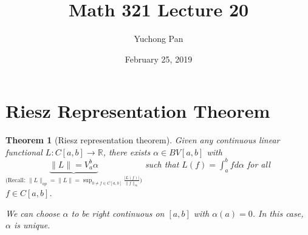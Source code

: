 \documentclass[letterpaper, reqno,11pt]{article}
\newcommand{\RR}{\mathbb{R}}
\begin{document}
\title{Math 321 Lecture 20}
\author{Yuchong Pan}
\date{February 25, 2019}
\newtheorem{thm}{Theorem}
\newtheorem{defn}{Definition}
\newtheorem*{remark}{Remark}
\newtheorem{claim}{Claim}
\newtheorem{cor}{Corollary}
\newtheorem{lemma}{Lemma}
\newtheorem{prop}{Proposition}
\maketitle
%

\section{Riesz Representation Theorem}

\begin{thm}[Riesz representation theorem]
  \normalfont Given any continuous linear functional $L : C[a, b] \to \RR$, there exists $\alpha \in BV[a, b]$ with $\underbrace{\lVert L \rVert = V_a^b \alpha}_\text{(Recall: $\lVert L \rVert_{op} = \lVert L \rVert = \sup_{0 \neq f \in C[a, b]} \frac{|L(f)|}{\lVert f \rVert_\infty}$)}$ such that $L(f) = \int_a^b fd\alpha$ for all $f \in C[a, b]$.

  We can choose $\alpha$ to be right continuous on $[a, b]$ with $\alpha(a) = 0$. In this case, $\alpha$ is unique.
\end{thm}
\end{document}
